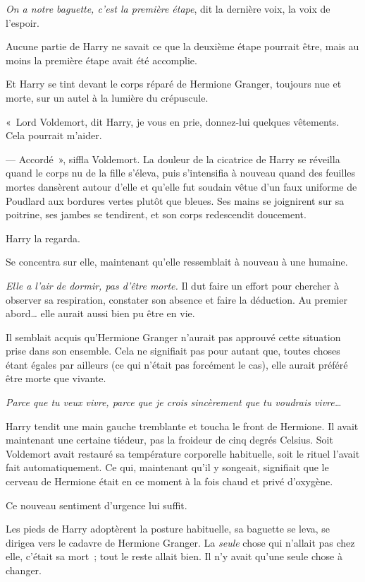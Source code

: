 \emph{On a notre baguette, c'est la première étape}, dit la dernière voix, la voix de l'espoir.

Aucune partie de Harry ne savait ce que la deuxième étape pourrait être, mais au moins la première étape avait été accomplie.

Et Harry se tint devant le corps réparé de Hermione Granger, toujours nue et morte, sur un autel à la lumière du crépuscule.

«~Lord Voldemort, dit Harry, je vous en prie, donnez-lui quelques vêtements.
Cela pourrait m'aider.

--- Accordé~», siffla Voldemort.
La douleur de la cicatrice de Harry se réveilla quand le corps nu de la fille s'éleva, puis s'intensifia à nouveau quand des feuilles mortes dansèrent autour d'elle et qu'elle fut soudain vêtue d'un faux uniforme de Poudlard aux bordures vertes plutôt que bleues.
Ses mains se joignirent sur sa poitrine, ses jambes se tendirent, et son corps redescendit doucement.

Harry la regarda.

Se concentra sur elle, maintenant qu'elle ressemblait à nouveau à une humaine.

\emph{Elle a l'air de dormir, pas d'être morte.} Il dut faire un effort pour chercher à observer sa respiration, constater son absence et faire la déduction.
Au premier abord… elle aurait aussi bien pu être en vie.

Il semblait acquis qu'Hermione Granger n'aurait pas approuvé cette situation prise dans son ensemble.
Cela ne signifiait pas pour autant que, toutes choses étant égales par ailleurs (ce qui n'était pas forcément le cas), elle aurait préféré être morte que vivante.

\emph{Parce que tu veux vivre, parce que je crois sincèrement que tu voudrais vivre…}

Harry tendit une main gauche tremblante et toucha le front de Hermione.
Il avait maintenant une certaine tiédeur, pas la froideur de cinq degrés Celsius.
Soit Voldemort avait restauré sa température corporelle habituelle, soit le rituel l'avait fait automatiquement.
Ce qui, maintenant qu'il y songeait, signifiait que le cerveau de Hermione était en ce moment à la fois chaud et privé d'oxygène.

Ce nouveau sentiment d'urgence lui suffit.

Les pieds de Harry adoptèrent la posture habituelle, sa baguette se leva, se dirigea vers le cadavre de Hermione Granger.
La \emph{seule} chose qui n'allait pas chez elle, c'était sa mort~; tout le reste allait bien.
Il n'y avait qu'une seule chose à changer.

